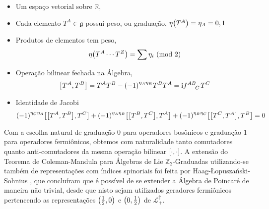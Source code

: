 \begin{itemize}
    \item Um espaço vetorial sobre $\mathbb R$,
    \item Cada elemento $T^A\in\mathfrak g$ possui peso, ou graduação, $\eta\qty(T^A)=\eta_A=0,1$
    \item Produtos de elementos tem peso,\[\eta\qty(T^A\cdots T^Z)=\sum\eta_i\ \qty(\textnormal{mod }2)\]
    \item Operação bilinear fechada na Álgebra,\[\comm{T^A}{T^B}=T^AT^B-\qty(-1)^{\eta_A\eta_B}T^BT^A=\im\tensor{f}{^A^B_C}T^C\]
    \item Identidade de Jacobi\[\qty(-1)^{\eta_C\eta_A}\comm{\comm{T^A}{T^B}}{T^C}+\qty(-1)^{\eta_A\eta_B}\comm{\comm{T^B}{T^C}}{T^A}+\qty(-1)^{\eta_B\eta_C}\comm{\comm{T^C}{T^A}}{T^B}=0\]
\end{itemize}

Com a escolha natural de graduação $0$ para operadores bosônicos e graduação $1$ para operadores fermiônicos, 
obtemos com naturalidade tanto comutadores quanto anti-comutadores da mesma operação bilinear $\comm{\cdot}{\cdot}$. 
A extensão do Teorema de Coleman-Mandula para Álgebras de Lie $\mathbb Z_2$-Graduadas utilizando-se também de 
representações com índices spinoriais foi feita por Haag-Łopuszański-Sohnius \cite{haag1975}, que concluíram 
que é possível de se extender a Álgebra de Poincaré de maneira não trivial, desde que nisto sejam utilizados 
geradores fermiônicos pertencendo as representações $\qty(\frac12,0)$ e $\qty(0,\frac12)$ de $\mathcal L^\uparrow_+$.